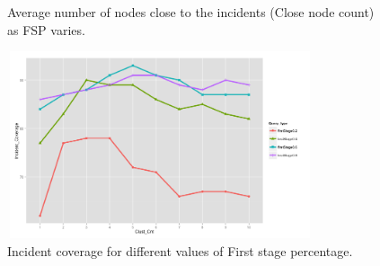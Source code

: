\documentclass{acm_proc_article-sp}
\begin{document}
\begin{figure}[!h]
{}
\caption{Average number of nodes close to the incidents (Close node count) as FSP varies.}
\label{fig:clusteredResults}
\end{figure}


\begin{figure}[!h]
\centering
\includegraphics[width=9cm ,height=5.5cm]{figuresPng/Coverage_Result.png}
\caption{Incident coverage for different values of First stage percentage. }
\label{fig: clustCoverage}
\end{figure}
\end{document}

